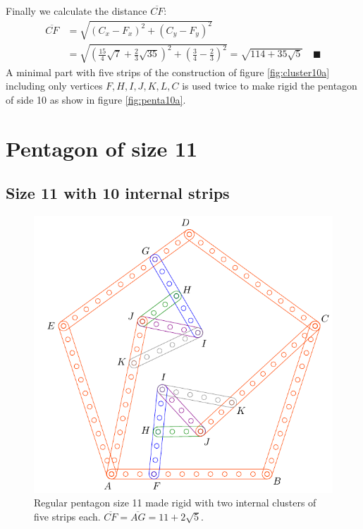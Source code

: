 \documentclass[11pt]{article}
\begin{document}
Finally we calculate the distance $\overline{CF}$:
\begin{align}
\overline{CF} &= \sqrt{(C_x - F_x)^2 + (C_y - F_y)^2}\nonumber\\
 &= \sqrt{\left(\frac{15}{4}\sqrt7 + \frac{2}{3}\sqrt{35}\right)^2
 + \left(\frac{3}4 - \frac{2}3\right)^2} %
 = \sqrt{114+35\sqrt5} \quad\blacksquare
\end{align}
A minimal part with five strips of the construction of figure \ref{fig:cluster10a} including only vertices $F,H,I,J,K,L,C$ is used twice to make rigid the pentagon of side 10 as show in figure \ref{fig:penta10a}.





\section{Pentagon of size 11}

\subsection{Size 11 with 10 internal strips}

\begin{figure}[h]
 \centering
 \includegraphics[scale=0.85]{11/penta11a}
 \caption{Regular pentagon size 11 made rigid with two internal clusters of five strips each.  $\overline{CF} = \overline{AG} = 11 + 2\sqrt5$.}
 \label{fig:penta11a}
\end{figure}
\end{document}
